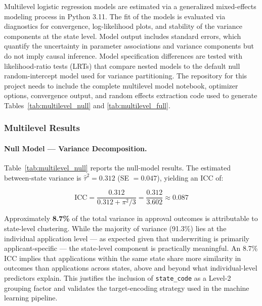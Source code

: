 \documentclass[12pt,letterpaper]{article}
\begin{document}
Multilevel logistic regression models are estimated via a generalized mixed-effects modeling process 
in Python 3.11. The fit of the models is evaluated via diagnostics for convergence, log-likelihood plots, 
and stability of the variance components at the state level. Model output includes standard errors, 
which quantify the uncertainty in parameter associations and variance components but do not imply 
causal inference. Model specification differences are tested with likelihood-ratio tests (LRTs) 
that compare nested models to the default null random-intercept model used for variance partitioning.
The repository for this project needs to include the complete multilevel model notebook, 
optimizer options, convergence output, and random effects extraction code used to generate
Tables~\ref{tab:multilevel_null} and
\ref{tab:multilevel_full}.
\subsubsection{Multilevel Results}

\paragraph{Null Model --- Variance Decomposition.}
Table~\ref{tab:multilevel_null} reports the null-model results. The estimated between-state
variance is $\hat{\tau}^2 = 0.312$ (SE $= 0.047$), yielding an ICC of:

\begin{equation*}
  \text{ICC} = \frac{0.312}{0.312 + \pi^2/3} = \frac{0.312}{3.602} \approx \mathbf{0.087}
\end{equation*}

Approximately \textbf{8.7\%} of the total variance in approval outcomes is attributable to
state-level clustering. While the majority of variance (91.3\%) lies at the individual
application level --- as expected given that underwriting is primarily applicant-specific ---
the state-level component is practically meaningful. An 8.7\% ICC implies that applications
within the same state share more similarity in outcomes than applications across states, above
and beyond what individual-level predictors explain. This justifies the inclusion of
\texttt{state\_code} as a Level-2 grouping factor and validates the target-encoding strategy
used in the machine learning pipeline.
\end{document}
